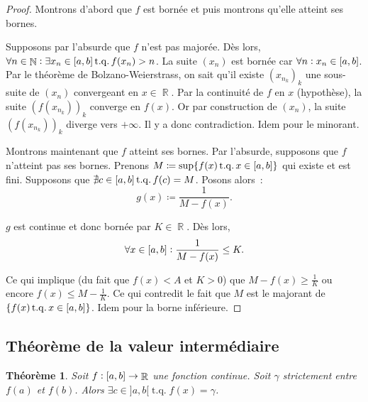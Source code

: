 \documentclass{article}
\DeclareMathOperator{\R}{\mathbb R}
\DeclareMathOperator{\N}{\mathbb N}
\DeclareMathOperator{\tq}{ t.q. }
\newcommand{\ab}{\interval ab}
\newcommand{\fabr}[1]{#1 : \ab \to \R}
\newtheorem{thm}{Théorème}[section]
\theoremstyle{definition}
\theoremstyle{remark}
\begin{document}
		\begin{proof} Montrons d'abord que $f$ est bornée et puis montrons qu'elle atteint ses bornes.

		Supposons par l'absurde que $f$ n'est pas majorée. Dès lors, $\forall n \in \N : \exists x_n \in \ab \tq f(x_n) > n$. La suite $(x_n)$ est bornée car
		$\forall n : x_n \in \ab$. Par le théorème de Bolzano-Weierstrass, on sait qu'il existe $(x_{n_k})_k$ une sous-suite de $(x_n)$ convergeant en
		$x \in \R$. Par la continuité de $f$ en $x$ (hypothèse), la suite $(f(x_{n_k}))_k$ converge en $f(x)$. Or par construction de $(x_n)$, la suite $(f(x_{n_k}))_k$
		diverge vers $+\infty$. Il y a donc contradiction. Idem pour le minorant.

		Montrons maintenant que $f$ atteint ses bornes. Par l'absurde, supposons que $f$ n'atteint pas ses bornes. Prenons
		$M \coloneqq \sup\{f(x) \tq x \in \ab\}$ qui existe et est fini. Supposons que $\nexists c \in \ab \tq f(c) = M$. Posons alors~:
		\[g(x) \coloneqq \frac 1{M - f(x)}.\]

		$g$ est continue et donc bornée par $K \in \R$. Dès lors,
		\[\forall x \in \ab : \frac 1{M-f(x)} \leq K.\]

		Ce qui implique (du fait que $f(x) < A$ et $K > 0$) que $M-f(x) \geq \frac 1K$ ou encore $f(x) \leq M - \frac 1K$. Ce qui contredit le fait que $M$ est le
		majorant de $\{f(x) \tq x \in \ab\}$. Idem pour la borne inférieure. \end{proof}
	
	\subsection{Théorème de la valeur intermédiaire}
		
		\begin{thm} Soit $\fabr f$ une fonction continue. Soit $\gamma$ strictement entre $f(a)$ et $f(b)$.
		Alors $\exists c \in ]a, b[ \tq f(x) = \gamma$. \end{thm}
\end{document}
